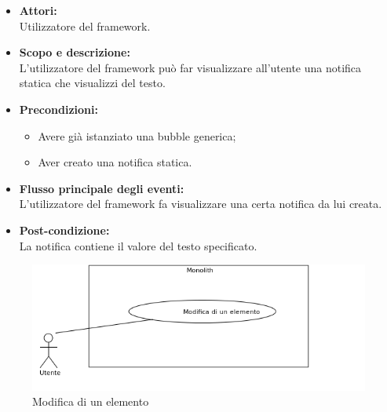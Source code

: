 \begin{itemize}
	\item \textbf{Attori:}
	\\Utilizzatore del framework.
	\item \textbf{Scopo e descrizione:} 
	\\L'utilizzatore del framework può far visualizzare all'utente una notifica statica che visualizzi del testo.
	\item \textbf{Precondizioni:}
	\begin{itemize}
		\item Avere già istanziato una bubble generica;
		\item Aver creato una notifica statica.
	\end{itemize}
	\item \textbf{Flusso principale degli eventi:}
	\\L'utilizzatore del framework fa visualizzare una certa notifica da lui creata.
	\item \textbf{Post-condizione:}
	\\La notifica contiene il valore del testo specificato.
\end{itemize}


\begin{figure}[H]
	\centering
	\includegraphics[width=15cm]{../../documenti/AnalisiDeiRequisiti/Diagrammi_img/uc1_05.png}
	\caption{\UCCCaption{} Modifica di un elemento}
\end{figure}

